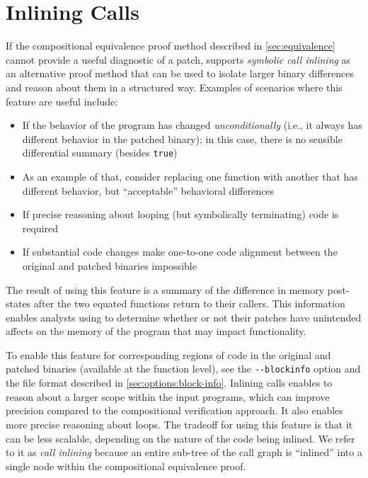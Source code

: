 \section{Inlining Calls}\label{sec:inlining}

If the compositional equivalence proof method described in \cref{sec:equivalence} cannot provide a useful diagnostic of a patch, \TOOL{} supports \emph{symbolic call inlining} as an alternative proof method that can be used to isolate larger binary differences and reason about them in a structured way. %
Examples of scenarios where this feature are useful include: %
\begin{itemize}
\item If the behavior of the program has changed \emph{unconditionally} (i.e., it always has different behavior in the patched binary); in this case, there is no sensible differential summary (besides \lstinline{true})
\item As an example of that, consider replacing one function with another that has different behavior, but ``acceptable'' behavioral differences
\item If precise reasoning about looping (but symbolically terminating) code is required
\item If substantial code changes make one-to-one code alignment between the original and patched binaries impossible
\end{itemize}

The result of using this feature is a summary of the difference in memory post-states after the two equated functions return to their callers. %
This information enables analysts using \TOOL{} to determine whether or not their patches have unintended affects on the memory of the program that may impact functionality. %

To enable this feature for corresponding regions of code in the original and patched binaries (available at the function level), see the \lstinline{--blockinfo} option and the file format described in \cref{sec:options:block-info}. %
Inlining calls enables \TOOL{} to reason about a larger scope within the input programs, which can improve precision compared to the compositional verification approach. %
It also enables more precise reasoning about loops. %
The tradeoff for using this feature is that it can be less scalable, depending on the nature of the code being inlined. %
We refer to it as \emph{call inlining} because an entire sub-tree of the call graph is ``inlined'' into a single node within the compositional equivalence proof. %

